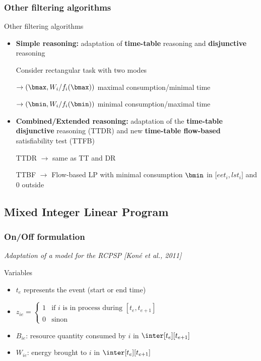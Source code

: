 \subsubsection{Other filtering algorithms}

\begin{frame}{Other filtering algorithms}
\vfill
\begin{itemize}
\item {\bf \color{blue!80!black!80} Simple reasoning: } adaptation of
  {\bf time-table} reasoning and {\bf disjunctive} reasoning
\vfill
\pause
{\color{gray!80!black!80}{\it Idea: } Consider rectangular task with two modes

  $\rightarrow (\bmax, W_i/f_i(\bmax))$ maximal consumption/minimal time

  $\rightarrow (\bmin, W_i/f_i(\bmin))$ minimal consumption/maximal
  time}
  \vfill
\pause
\item {\bf \color{blue!80!black!80} Combined/Extended reasoning: }
  adaptation of the {\bf time-table disjunctive} reasoning (TTDR) and
  new {\bf time-table flow-based} satisfiability test (TTFB)
  \vfill
\pause
  {\color{gray!80!black!80}{\it Idea: } TTDR $\rightarrow$ same as TT and DR

  TTBF $\rightarrow$ Flow-based LP with minimal consumption $\bmin$ in
  ${[}eet_i,lst_i {]}$ and $0$ outside}
\end{itemize}
\vfill
\end{frame}


\subsection{Mixed Integer Linear Program}

\begin{frame}
  \frametitle{On/Off formulation}
  {\small \it Adaptation of a model for the RCPSP {\color{gray!50!black!50} \it [Koné et al., 2011]}}
  \vfill
  \begin{block}{Variables}
    \begin{itemize}
    \item  $t_e$ represents the event (start or end time)
      \pause
      \vspace{0.3cm}
    \item $z_{ie}=\left\{
        \begin{array}{ll}
          1 & \text{if $i$ is in process during $[t_{e},t_{e+1}]$}\\
          0 & \text{sinon}
        \end{array}
      \right.
      $
      \pause
      \vspace{0.3cm}
    \item $B_{ie}$: resource quantity consumed by $i$ in $\inter[t_e][t_{e+1}]$
      \vspace{0.3cm}
    \item $W_{ie}$: energy brought to $i$ in $\inter[t_e][t_{e+1}]$   
    \end{itemize}
  \end{block}
\end{frame}


